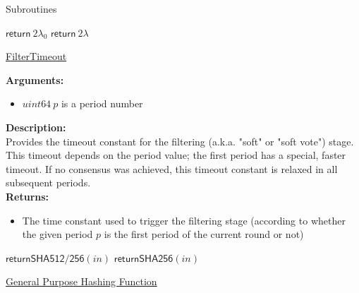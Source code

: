\documentclass[10pt,a4paper]{article}
\begin{document}
\begin{section}{Subroutines}\label{sect:soubroutines}


\begin{algorithm}[H]
    \begin{algorithmic}[1]
            \State $\mathsf{return} \ 2\lambda_0$
        \Else 
            \State $\mathsf{return} \ 2\lambda$
        \EndIf
    \EndFunction
    \end{algorithmic}
    \caption{\underline{FilterTimeout}}
\end{algorithm}

\noindent \textbf{Arguments:}
\begin{itemize}
    \item $uint64 \ p$ is a period number
  \end{itemize}

\noindent \textbf{Description:}\\
Provides the timeout constant for the filtering (a.k.a. "soft" or "soft vote") stage.
This timeout depends on the period value; the first period has a special, faster timeout.
If no consensus was achieved, this timeout constant is relaxed in all subsequent periods. \\

\noindent \textbf{Returns:}
\begin{itemize}
    \item The time constant used to trigger the filtering stage (according to whether the given
    period $p$ is the first period of the current round or not)
  \end{itemize}


\begin{algorithm}[H]
    \begin{algorithmic}[1]
            \State $\mathsf{return SHA512/256}(in)$
        \Else
            \State $\mathsf{return SHA256}(in)$
        \EndIf
    \EndFunction
    \end{algorithmic}
    \caption{\underline{General Purpose Hashing Function}}
\end{algorithm}


\end{section}
\end{document}
